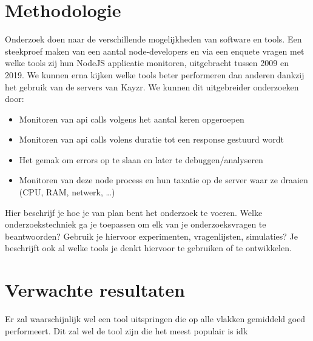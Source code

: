 

\section{Methodologie}
\label{sec:methodologie}

Onderzoek doen naar de verschillende mogelijkheden van software en tools. Een steekproef maken van een aantal node-developers en via een enquete vragen met welke tools zij hun NodeJS applicatie monitoren, uitgebracht tussen 2009 en 2019. We kunnen erna kijken welke tools beter performeren dan anderen dankzij het gebruik van de servers van Kayzr. We kunnen dit uitgebreider onderzoeken door:

\begin{itemize}
	\item Monitoren van api calls volgens het aantal keren opgeroepen
	\item Monitoren van api calls volens duratie tot een response gestuurd wordt
	\item Het gemak om errors op te slaan en later te debuggen/analyseren
	\item Monitoren van deze node process en hun taxatie op de server waar ze draaien (CPU, RAM, netwerk, …)
\end{itemize}

Hier beschrijf je hoe je van plan bent het onderzoek te voeren. Welke onderzoekstechniek ga je toepassen om elk van je onderzoeksvragen te beantwoorden? Gebruik je hiervoor experimenten, vragenlijsten, simulaties? Je beschrijft ook al welke tools je denkt hiervoor te gebruiken of te ontwikkelen. 

\section{Verwachte resultaten}
\label{sec:verwachte_resultaten}

Er zal waarschijnlijk wel een tool uitspringen die op alle vlakken gemiddeld goed performeert. Dit zal wel de tool zijn die het meest populair is idk

